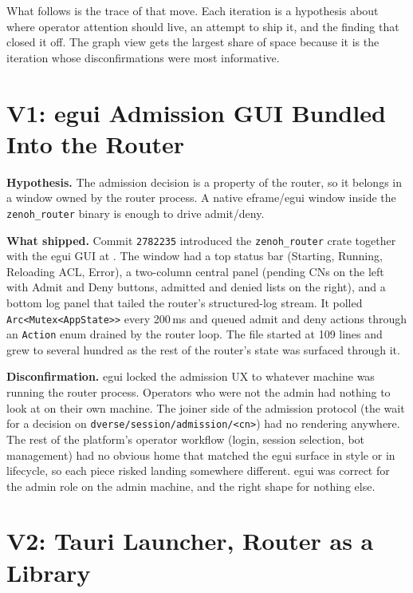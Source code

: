 \documentclass[11pt,a4paper]{article}
\begin{document}
What follows is the trace of that move. Each iteration is a
hypothesis about where operator attention should live, an attempt
to ship it, and the finding that closed it off. The graph view
gets the largest share of space because it is the iteration
whose disconfirmations were most informative.

\section{V1: egui Admission GUI Bundled Into the Router}

\textbf{Hypothesis.} The admission decision is a property of the
router, so it belongs in a window owned by the router process. A
native eframe/egui window inside the \texttt{zenoh\_router} binary
is enough to drive admit/deny.

\textbf{What shipped.} Commit \texttt{2782235} introduced the
\texttt{zenoh\_router} crate together with the egui GUI at
. The window had a top status
bar (Starting, Running, Reloading ACL, Error), a two-column
central panel (pending CNs on the left with Admit and Deny
buttons, admitted and denied lists on the right), and a bottom
log panel that tailed the router's structured-log stream. It
polled \texttt{Arc<Mutex<AppState>{}>} every 200\,ms and queued
admit and deny actions through an \texttt{Action} enum drained by
the router loop. The file started at 109 lines and grew to
several hundred as the rest of the router's state was surfaced
through it.

\textbf{Disconfirmation.} egui locked the admission UX to whatever
machine was running the router process. Operators who were not
the admin had nothing to look at on their own machine. The
joiner side of the admission protocol (the wait for a decision
on \texttt{dverse/session/admission/<cn>}) had no rendering
anywhere. The rest of the platform's operator workflow (login,
session selection, bot management) had no obvious home that
matched the egui surface in style or in lifecycle, so each piece
risked landing somewhere different. egui was correct for the
admin role on the admin machine, and the right shape for nothing
else.

\section{V2: Tauri Launcher, Router as a Library}
\end{document}

